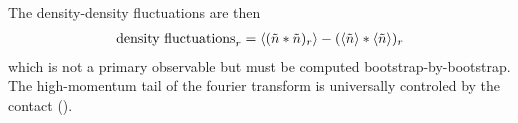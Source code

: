The density-density fluctuations are then
\begin{align}
    \text{density fluctuations}_r = \left\langle  (\tilde{n}*\tilde{n})_r  \right\rangle - (\left\langle \tilde{n} \right\rangle * \left\langle \tilde{n} \right\rangle)_r
\end{align}
which is not a primary observable but must be computed bootstrap-by-bootstrap.
The high-momentum tail of the fourier transform is universally controled by the contact ().
